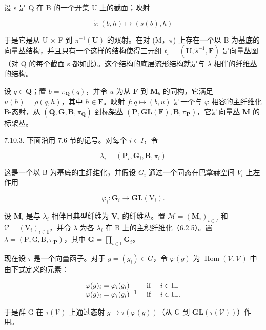 设 s 是 Q 在 B 的一个开集 U 上的截面；映射

\[
\tilde {s}: (b, h) \mapsto (s (b), h)
\]

于是它是从 U \(\times\) F 到 \(\pi^{-1}(\mathbf{U})\) 的双射。在对 (M，\(\pi\)) 上存在一个以 B 为基底的向量丛结构，并且只有一个这样的结构使得三元组 \(t_{s} = (\mathbf{U}, \tilde{s}^{-1}, \mathbf{F})\) 是向量丛图（对 Q 的每个截面 s 都如此）。这个结构的底层流形结构就是与 \(\lambda\) 相伴的纤维丛的结构。

设 \(q \in \mathbf{Q}\)；置 \(b = \pi_{\mathbf{Q}}(q)\)，并令 \(u\) 为从 \(\mathbf{F}\) 到 \(\mathbf{M}_b\) 的同构，它满足 \(u(h) = \rho(q, h)\)，其中 \(h \in \mathbf{F}\)。映射 \(f: q \mapsto (b, u)\) 是一个与 \(\varphi\) 相容的主纤维化 B-态射，从 \((\mathbf{Q}, \mathbf{G}, \mathbf{B}, \pi_{\mathbf{Q}})\) 到标架丛 \((\mathbf{P}, \mathbf{GL}(\mathbf{F}), \mathbf{B}, \pi_{\mathbf{P}})\)，它是向量丛 \(\mathbf{M}\) 的标架丛。

7.10.3. 下面沿用 7.6 节的记号。对每个 \(i \in I\)，令

\[
\lambda_ {i} = (\mathbf {P} _ {i}, \mathbf {G} _ {i}, \mathbf {B}, \pi_ {i})
\]

这是一个以 B 为基底的主纤维化，并假设 \(G_{i}\) 通过一个同态在巴拿赫空间 \(V_{i}\) 上左作用

\[
\varphi_{i}: \mathbf{G}_{i} \rightarrow \mathbf{GL}(\mathrm{V}_{i}).
\]

设 \(\mathbf{M}_i\) 是与 \(\lambda_i\) 相伴且典型纤维为 \(\mathbf{V}_i\) 的纤维丛。置 \(\mathcal{M} = (\mathbf{M}_i)_{i\in I}\) 和 \(\mathcal{V} = (\mathrm{V}_i)_{i\in \mathbf{I}}\)，并令 \(\lambda\) 为各 \(\lambda_{i}\) 在 B 上的主积纤维化（6.2.5）。置 \(\lambda = (\mathrm{P},\mathrm{G},\mathrm{B},\pi_{\mathbf{P}})\)，其中 \(\mathbf{G} = \prod_{i\in \mathbf{I}}\mathbf{G}_i\)。

现在设 \(\tau\) 是一个向量函子。对于 \(g = (g_i) \in G\)，令 \(\varphi(g)\) 为 \(\operatorname{Hom}(\mathcal{V}, \mathcal{V})\) 中由下式定义的元素：

\[
\begin{array}{l l} \varphi (g) _ {i} = \varphi_ {i} (g _ {i}) & \text { if } \quad i \in \mathrm{I} _ {+} \\ \varphi (g) _ {i} = \varphi_ {i} (g _ {i}) ^ {- 1} & \text { if } \quad i \in \mathrm{I} _ {-}. \end{array}
\]

于是群 G 在 \(\tau(\mathcal{V})\) 上通过态射 \(g\mapsto\tau(\varphi(g))\)（从 G 到 \(\mathbf{GL}(\tau(\mathcal{V}))\)）作用。


